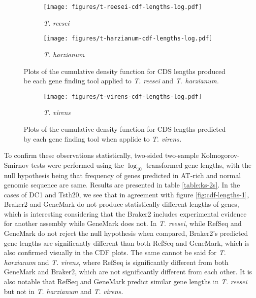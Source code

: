 \begin{figure}
  \centering
  \begin{subfigure}{0.7\textwidth}
    \texttt{[image: figures/t-reesei-cdf-lengths-log.pdf]}
    \label{fig:treesei-lengths}
    \caption{\textit{T. reesei}}
  \end{subfigure}
  \begin{subfigure}{0.7\textwidth}
    \texttt{[image: figures/t-harzianum-cdf-lengths-log.pdf]}
    \label{fig:tharzianum-lengths}
    \caption{\textit{T. harzianum}}
  \end{subfigure}
  \caption[CDF plots part 2.]{Plots of the cumulative density function
    for CDS lengths produced be each gene finding tool applied to
    \textit{T. reesei} and \textit{T. harzianum.}}
  \label{fig:cdf-lengths-2}
\end{figure}

\begin{figure}
  \centering
  \begin{subfigure}{0.7\textwidth}
    \texttt{[image: figures/t-virens-cdf-lengths-log.pdf]}
    \label{fig:tvirens-lengths}
    \caption{\textit{T. virens}}
  \end{subfigure}
  \caption[CDF plots part 3.]{Plots of the
    cumulative density function for CDS lengths predicted by each gene
    finding tool when applide to \textit{T. virens.}}
  \label{fig:cdf-lengths-3}
\end{figure}

To confirm these observations statistically, two-sided two-sample
Kolmogorov-Smirnov tests were performed using the $\log_{10}$
transformed gene lengths, with the null hypothesis being that
frequency of genes predicted in AT-rich and normal genomic sequence
are same. Results are presented in table \ref{table:ks-2s}. In the
cases of DC1 and Tsth20, we see that in agreement with figure
\ref{fig:cdf-lengths-1}, Braker2 and GeneMark do not produce
statistically different lengths of genes, which is interesting
considering that the Braker2 includes experimental evidence for
another assembly while GeneMark does not. In \textit{T. reesei}, while
RefSeq and GeneMark do not reject the null hypothesis when compared,
Braker2's predicted gene lengths are significantly different than both
RefSeq and GeneMark, which is also confirmed visually in the CDF
plots. The same cannot be said for \textit{T. harzianum} and
\textit{T. virens}, where RefSeq is significantly different from both
GeneMark and Braker2, which are not significantly different from each
other. It is also notable that RefSeq and GeneMark predict similar
gene lengths in \textit{T. reesei} but not in \textit{T. harzianum}
and \textit{T. virens.}

